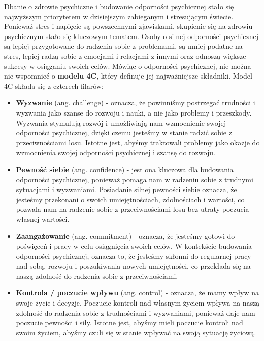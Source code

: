 Dbanie o zdrowie psychiczne i budowanie odporności psychicznej stało się
najwyższym priorytetem w dzisiejszym zabieganym i stresującym świecie. Ponieważ
stres i napięcie są powszechnymi zjawiskami, skupienie się na zdrowiu
psychicznym stało się kluczowym tematem. Osoby o silnej odporności psychicznej
są lepiej przygotowane do radzenia sobie z problemami, są mniej podatne na
stres, lepiej radzą sobie z emocjami i relacjami z innymi oraz odnoszą większe
sukcesy w osiąganiu swoich celów. Mówiąc o odporności psychicznej, nie można nie
wspomnieć o \textbf{modelu 4C}, który definuje jej najważniejsze składniki.
Model 4C składa się z czterech filarów:

\begin{itemize}
    \item \textbf{Wyzwanie} (ang. challenge) - oznacza, że powinniśmy postrzegać
          trudności i wyzwania jako szanse do rozwoju i nauki, a nie jako
          problemy i przeszkody. Wyzwania stymulują rozwój i umożliwiają nam
          wzmocnienie swojej odporności psychicznej, dzięki czemu jesteśmy w
          stanie radzić sobie z przeciwnościami losu. Istotne jest, abyśmy
          traktowali problemy jako okazje do wzmocnienia swojej odporności
          psychicznej i szansę do rozwoju.
    \item  \textbf{Pewność siebie} (ang. confidence) - jest ona kluczowa dla
          budowania odporności psychicznej, ponieważ pomaga nam w radzeniu sobie
          z trudnymi sytuacjami i wyzwaniami. Posiadanie silnej pewności siebie
          oznacza, że jesteśmy przekonani o swoich umiejętnościach, zdolnościach
          i wartości, co pozwala nam na radzenie sobie z przeciwnościami losu
          bez utraty poczucia własnej wartości.
    \item \textbf{Zaangażowanie} (ang. commitment) - oznacza, że jesteśmy gotowi
          do poświęceń i pracy w celu osiągnięcia swoich celów. W kontekście
          budowania odporności psychicznej, oznacza to, że jesteśmy skłonni do
          regularnej pracy nad sobą, rozwoju i poszukiwania nowych umiejętności,
          co przekłada się na naszą zdolność do radzenia sobie z
          przeciwnościami.
    \item \textbf{Kontrola / poczucie wpływu} (ang. control) - oznacza, że mamy
          wpływ na swoje życie i decyzje. Poczucie kontroli nad własnym życiem
          wpływa na naszą zdolność do radzenia sobie z trudnościami i
          wyzwaniami, ponieważ daje nam poczucie pewności i siły. Istotne jest,
          abyśmy mieli poczucie kontroli nad swoim życiem, abyśmy czuli się w
          stanie wpływać na swoją sytuację życiową.
\end{itemize}

